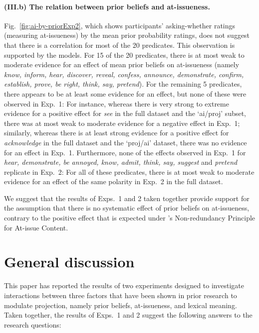 \documentclass[11pt,fleqn]{article}
\newcommand{\6}{\mbox{$[\hspace*{-.6mm}[$}}
\newcommand{\9}{\mbox{$]\hspace*{-.6mm}]$}}
\newcommand{\citepos}[1]{\citeauthor{#1}'s \citeyear{#1}}
\begin{document}
\paragraph{(III.b) The relation between prior beliefs and at-issueness.} 

Fig.~\ref{fig:ai-by-priorExp2}, which shows participants' asking-whether ratings (measuring at-issueness) by the mean prior probability ratings, does not suggest that there is a correlation for most of the 20 predicates. This observation is supported by the models. For 15 of the 20 predicates, there is at most weak to moderate evidence for an effect of mean prior beliefs on at-issueness (namely {\em know, inform, hear, discover, reveal, confess, announce, demonstrate, confirm, establish, prove, be right, think, say, pretend}). For the remaining 5 predicates, there appears to be at least some evidence for an effect, but none of these were observed in Exp.~1: For instance, whereas there is very strong to extreme evidence for a positive effect for {\em see} in the full dataset and the `ai/proj' subset, there was at most weak to moderate evidence for a negative effect in Exp.~1; similarly, whereas there is at least strong evidence for a positive effect for {\em acknowledge} in the full dataset and the `proj/ai' dataset, there was no evidence for an effect in Exp.~1. Furthermore, none of the effects observed in Exp.~1 for {\em hear, demonstrate, be annoyed, know, admit, think, say, suggest} and {\em pretend} replicate in Exp.~2: For all of these predicates, there is at most weak to moderate evidence for an effect of the same polarity in Exp.~2 in the full dataset. 

We suggest that the results of Exps.~1 and 2 taken together provide support for the assumption that there is no systematic effect of prior beliefs on at-issueness, contrary to the positive effect that is expected under \citepos{tonhauser-etal-eval} Non-redundancy Principle for At-issue Content.

\section{General discussion}\label{s4}

This paper has reported the results of two experiments designed to investigate interactions between three factors that have been shown in prior research to modulate projection, namely prior beliefs, at-issueness, and lexical meaning. Taken together, the results of Exps.~1 and 2 suggest the following answers to the research questions:
\end{document}
